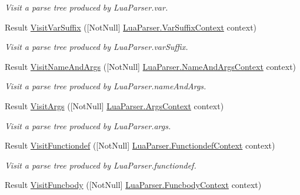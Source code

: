 \begin{DoxyCompactItemize}
\begin{DoxyCompactList}\small\item\em Visit a parse tree produced by Lua\+Parser.\+var. \end{DoxyCompactList}\item 
Result \mbox{\hyperlink{interfacezlua_1_1_i_lua_visitor_ae2449e1f9969f993c00cea039da1d48e}{Visit\+Var\+Suffix}} (\mbox{[}Not\+Null\mbox{]} \mbox{\hyperlink{classzlua_1_1_lua_parser_1_1_var_suffix_context}{Lua\+Parser.\+Var\+Suffix\+Context}} context)
\begin{DoxyCompactList}\small\item\em Visit a parse tree produced by Lua\+Parser.\+var\+Suffix. \end{DoxyCompactList}\item 
Result \mbox{\hyperlink{interfacezlua_1_1_i_lua_visitor_ac5b8231ca7341838cf864725ea880083}{Visit\+Name\+And\+Args}} (\mbox{[}Not\+Null\mbox{]} \mbox{\hyperlink{classzlua_1_1_lua_parser_1_1_name_and_args_context}{Lua\+Parser.\+Name\+And\+Args\+Context}} context)
\begin{DoxyCompactList}\small\item\em Visit a parse tree produced by Lua\+Parser.\+name\+And\+Args. \end{DoxyCompactList}\item 
Result \mbox{\hyperlink{interfacezlua_1_1_i_lua_visitor_afa6af1e3dc7c517b12ee24b253c6f70f}{Visit\+Args}} (\mbox{[}Not\+Null\mbox{]} \mbox{\hyperlink{classzlua_1_1_lua_parser_1_1_args_context}{Lua\+Parser.\+Args\+Context}} context)
\begin{DoxyCompactList}\small\item\em Visit a parse tree produced by Lua\+Parser.\+args. \end{DoxyCompactList}\item 
Result \mbox{\hyperlink{interfacezlua_1_1_i_lua_visitor_aa4ae9c9b23327ffa825c98325c4a228e}{Visit\+Functiondef}} (\mbox{[}Not\+Null\mbox{]} \mbox{\hyperlink{classzlua_1_1_lua_parser_1_1_functiondef_context}{Lua\+Parser.\+Functiondef\+Context}} context)
\begin{DoxyCompactList}\small\item\em Visit a parse tree produced by Lua\+Parser.\+functiondef. \end{DoxyCompactList}\item 
Result \mbox{\hyperlink{interfacezlua_1_1_i_lua_visitor_a4362832ba6c73a073512b353b87560d4}{Visit\+Funcbody}} (\mbox{[}Not\+Null\mbox{]} \mbox{\hyperlink{classzlua_1_1_lua_parser_1_1_funcbody_context}{Lua\+Parser.\+Funcbody\+Context}} context)

\end{DoxyCompactItemize}
